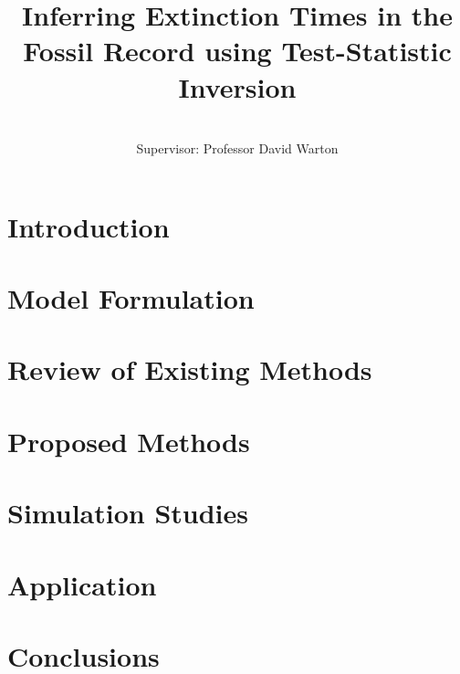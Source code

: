 \documentclass[honours,12pt]{UNSWthesis}
\title{Inferring Extinction Times in the Fossil Record using Test-Statistic Inversion}
\author{\Authornameonly\\{\bigskip}Supervisor: Professor David Warton}
\begin{document}
%
%

\beforepreface

\afterpage{\blankpage}







\afterpreface

\afterpage{\blankpage}

%
%

\chapter{Introduction}\label{chap: intro}


\chapter{Model Formulation}\label{chap: assumptions}


\chapter{Review of Existing Methods}\label{chap: existing-methods}


\chapter{Proposed Methods}\label{chap: proposed-methods}


\chapter{Simulation Studies}\label{chap: simulation-experiments}


\chapter{Application}\label{chap: applications}


\chapter{Conclusions}\label{chap: conclusions}

\end{document}
